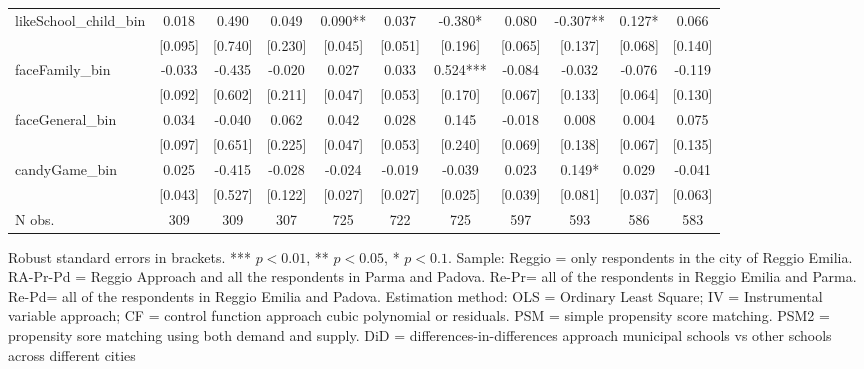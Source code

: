 \documentclass[12pt]{article}
\begin{document}
\begin{table}[ht]
\begin{center}
\begin{adjustbox}{width=1.2\textwidth,center=\textwidth}
\begin{tabular}{l*{10}{c}}
likeSchool\_child\_bin & 0.018 & 0.490 & 0.049 & 0.090** & 0.037 & -0.380* & 0.080 & -0.307** & 0.127* & 0.066 \\
 & [0.095] & [0.740] & [0.230] & [0.045] & [0.051] & [0.196] & [0.065] & [0.137] & [0.068] & [0.140] \\
faceFamily\_bin & -0.033 & -0.435 & -0.020 & 0.027 & 0.033 & 0.524*** & -0.084 & -0.032 & -0.076 & -0.119 \\
 & [0.092] & [0.602] & [0.211] & [0.047] & [0.053] & [0.170] & [0.067] & [0.133] & [0.064] & [0.130] \\
faceGeneral\_bin & 0.034 & -0.040 & 0.062 & 0.042 & 0.028 & 0.145 & -0.018 & 0.008 & 0.004 & 0.075 \\
 & [0.097] & [0.651] & [0.225] & [0.047] & [0.053] & [0.240] & [0.069] & [0.138] & [0.067] & [0.135] \\
candyGame\_bin & 0.025 & -0.415 & -0.028 & -0.024 & -0.019 & -0.039 & 0.023 & 0.149* & 0.029 & -0.041 \\
 & [0.043] & [0.527] & [0.122] & [0.027] & [0.027] & [0.025] & [0.039] & [0.081] & [0.037] & [0.063] \\

\hline
N obs. &  309 & 309 & 307 & 725 & 722 & 725 & 597 & 593 & 586 & 583 \\

\hline
\end{tabular}
\end{adjustbox}
\end{center}
\par

\vspace{1ex}
\par



{\footnotesize \raggedright{Robust standard errors in brackets. *** $p<0.01$, ** $p<0.05$, * $p<0.1$. Sample: Reggio = only respondents in the city of Reggio Emilia. RA-Pr-Pd = Reggio Approach and all the respondents in Parma and Padova. Re-Pr= all of the respondents in Reggio Emilia and Parma. Re-Pd= all of the respondents in Reggio Emilia and Padova. Estimation method: OLS = Ordinary Least Square; IV = Instrumental variable approach; CF = control function approach cubic polynomial or residuals. PSM = simple propensity score matching. PSM2 = propensity sore matching using both demand and supply. DiD = differences-in-differences approach municipal schools vs other schools across different cities} }

\end{table}
\end{document}
